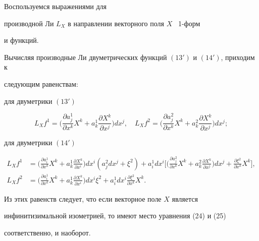 \begin{pf}


Воспользуемся выражениями для


производной Ли $L_X$ в направлении векторного поля $X$ \ 1-форм


и функций.


Вычисляя производные Ли двуметрических функций $(13')$ и $(14')$, приходим к


следующим равенствам:





для двуметрики $(13')$


$$


L_Xf^1=\bigg( \frac{\partial a_j^1}{\partial x^k}X^k+a_k^1


\frac{\partial X^k}{\partial x^j}\bigg) dx^j,\quad


L_Xf^2=\bigg( \frac{\partial a_j^2}{\partial x^k}X^k+a_k^2


\frac{\partial X^k}{\partial x^j}\bigg) dx^j;


$$





для двуметрики $(14')$


\begin{align*}


L_Xf^1&=\bigg(\frac{\partial a_i^1}{\partial x^k}X^k+a_k^1


\frac{\partial X^k}{\partial x^i}\bigg) dx^i(a^2_jdx^j+\xi^2)+


a^1_idx^i\bigg[\bigg(


\frac{\partial a_j^2}{\partial x^k}X^k+ a_k^2\frac{\partial X^k


}{\partial x^j}\bigg) dx^j+\frac{\partial \xi^2}{\partial x^k}X^k\bigg],\\


%


L_Xf^2&=\bigg(\frac{\partial a_i^1}{\partial x^k}X^k+a_k^1\frac{\partial X^k


}{\partial x^i}\bigg) dx^i\xi^2+a^1_idx^i\frac{\partial \xi^2}{\partial


x^k}X^k.


\end{align*}


Из этих равенств следует, что если векторное поле $X$ является


инфинитизимальной изометрией, то имеют место уравнения (24) и (25)


соответственно, и наоборот.


\end{pf}





